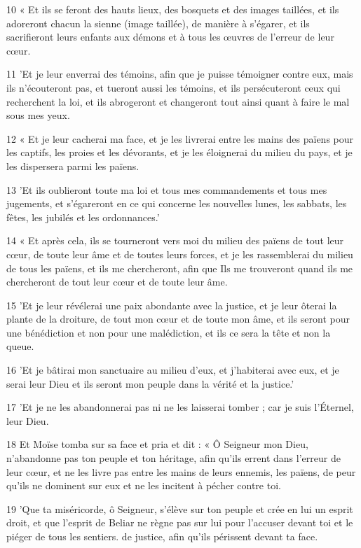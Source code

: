 \par 10 « Et ils se feront des hauts lieux, des bosquets et des images taillées, et ils adoreront chacun la sienne (image taillée), de manière à s'égarer, et ils sacrifieront leurs enfants aux démons et à tous les œuvres de l'erreur de leur cœur.
\par 11 'Et je leur enverrai des témoins, afin que je puisse témoigner contre eux, mais ils n'écouteront pas, et tueront aussi les témoins, et ils persécuteront ceux qui recherchent la loi, et ils abrogeront et changeront tout ainsi quant à faire le mal sous mes yeux.
\par 12 « Et je leur cacherai ma face, et je les livrerai entre les mains des païens pour les captifs, les proies et les dévorants, et je les éloignerai du milieu du pays, et je les dispersera parmi les païens.
\par 13 'Et ils oublieront toute ma loi et tous mes commandements et tous mes jugements, et s'égareront en ce qui concerne les nouvelles lunes, les sabbats, les fêtes, les jubilés et les ordonnances.'
\par 14 « Et après cela, ils se tourneront vers moi du milieu des païens de tout leur cœur, de toute leur âme et de toutes leurs forces, et je les rassemblerai du milieu de tous les païens, et ils me chercheront, afin que Ils me trouveront quand ils me chercheront de tout leur cœur et de toute leur âme.
\par 15 'Et je leur révélerai une paix abondante avec la justice, et je leur ôterai la plante de la droiture, de tout mon cœur et de toute mon âme, et ils seront pour une bénédiction et non pour une malédiction, et ils ce sera la tête et non la queue.
\par 16 'Et je bâtirai mon sanctuaire au milieu d'eux, et j'habiterai avec eux, et je serai leur Dieu et ils seront mon peuple dans la vérité et la justice.'
\par 17 'Et je ne les abandonnerai pas ni ne les laisserai tomber ; car je suis l'Éternel, leur Dieu.
\par 18 Et Moïse tomba sur sa face et pria et dit : « Ô Seigneur mon Dieu, n'abandonne pas ton peuple et ton héritage, afin qu'ils errent dans l'erreur de leur cœur, et ne les livre pas entre les mains de leurs ennemis, les païens, de peur qu'ils ne dominent sur eux et ne les incitent à pécher contre toi.
\par 19 'Que ta miséricorde, ô Seigneur, s'élève sur ton peuple et crée en lui un esprit droit, et que l'esprit de Beliar ne règne pas sur lui pour l'accuser devant toi et le piéger de tous les sentiers. de justice, afin qu'ils périssent devant ta face.
